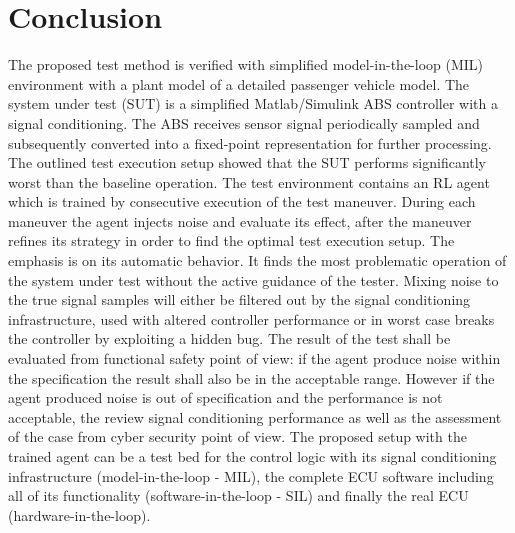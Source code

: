\documentclass[a4paper, fleqn]{template/cas-dc}
\begin{document}
	\section{Conclusion}
	The proposed test method is verified with simplified model-in-the-loop (MIL) environment with a plant model of a detailed passenger vehicle model. The system under test (SUT) is a simplified Matlab/Simulink ABS controller with a signal conditioning. The ABS receives sensor signal periodically sampled and subsequently converted into a fixed-point representation for further processing.
	The outlined test execution setup showed that the SUT performs significantly worst than the baseline operation. The test environment contains an RL agent which is trained by consecutive execution of the test maneuver. During each maneuver the agent injects noise and evaluate its effect, after the maneuver refines its strategy in order to find the optimal test execution setup.
	The emphasis is on its automatic behavior. It finds the most problematic operation of the system under test without the active guidance of the tester. Mixing noise to the true signal samples will either be filtered out by the signal conditioning infrastructure, used with altered controller performance or in worst case breaks the controller by exploiting a hidden bug. The result of the test shall be evaluated from functional safety point of view: if the agent produce noise within the specification the result shall also be in the acceptable range. However if the agent produced noise is out of specification and the performance is not acceptable, the review signal conditioning performance as well as the assessment of the case from cyber security point of view.
	The proposed setup with the trained agent can be a test bed for the control logic with its signal conditioning infrastructure (model-in-the-loop - MIL), the complete ECU software including all of its functionality (software-in-the-loop - SIL) and finally the real ECU (hardware-in-the-loop). 
	 
	 
		
	
				
	
\end{document}

